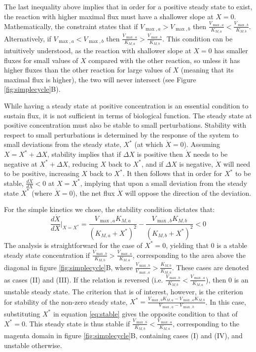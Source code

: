     The last inequality above implies that in order for a positive steady state to exist, the reaction with higher maximal flux must have a shallower slope at $X=0$.
    Mathematically, the constraint states that if $V_{\max,a}>V_{\max,b}$ then $\frac{V_{\max,a}}{K_{M,a}}<\frac{V_{\max,b}}{K_{M,b}}$.
    Alternatively, if $V_{\max,a}<V_{\max,b}$ then $\frac{V_{\max,a}}{K_{M,a}}>\frac{V_{\max,b}}{K_{M,b}}$.
    This condition can be intuitively understood, as the reaction with shallower slope at $X=0$ has smaller fluxes for small values of $X$ compared with the other reaction, so unless it has higher fluxes than the other reaction for large values of $X$ (meaning that its maximal flux is higher), the two will never intersect (see Figure \ref{fig:simplecycle}B).

    While having a steady state at positive concentration is an essential condition to sustain flux, it is not sufficient in terms of biological function.
    The steady state at positive concentration must also be stable to small perturbations.
    Stability with respect to small perturbations is determined by the response of the system to small deviations from the steady state, $X^*$ (at which $\dot X=0$).
    Assuming $X = X^*+\Delta X$, stability implies that if $\Delta X$ is positive then $\dot X$ needs to be negative at $X^*+\Delta X$, reducing $X$ back to $X^*$, and if $\Delta X$ is negative, $\dot X$ will need to be positive, increasing $X$ back to $X^*$.
    It then follows that in order for $X^*$ to be stable, $\frac{d\dot X}{dX} <0$ at $X=X^*$, implying that upon a small deviation from the steady state $X^*$ (where $\dot X=0$), the net flux $\dot X$ will oppose the direction of the deviation.

    For the simple kinetics we chose, the stability condition dictates that:
    \begin{equation}
        \label{eq:stable}
      \frac{d\dot X}{dX}\Big\vert_{X=X^*} = \frac{V_{\max,a}K_{M,a}}{(K_{M,a}+X^*)^2}-\frac{V_{\max,b}K_{M,b}}{(K_{M,b}+X^*)^2}<0
    \end{equation}
    The analysis is straightforward for the case of $X^*=0$, yielding that $0$ is a stable steady state concentration if $\frac{V_{\max,b}}{K_{M,b}}>\frac{V_{\max,a}}{K_{M,a}}$, corresponding to the area above the diagonal in figure \ref{fig:simplecycle}B, where $\frac{V_{\max,b}}{V_{\max,a}}>\frac{K_{M,b}}{K_{M,a}}$. These cases are denoted as cases (II) and (III).
    If the relation is reversed (i.e. $\frac{V_{\max,b}}{K_{M,b}}<\frac{V_{\max,a}}{K_{M,a}}$), then $0$ is an unstable steady state.
    The criterion that is of interest, however, is the criterion for stability of the non-zero steady state, $X^*=\frac{V_{\max,b}K_{M,a}-V_{\max,a}K_{M,b}}{V_{\max,a}-V_{\max,b}}$.
    In this case, substituting $X^*$ in equation \ref{eq:stable} gives the opposite condition to that of $X^*=0$.
    This steady state is thus stable if $\frac{V_{\max,b}}{K_{M,b}}<\frac{V_{\max,a}}{K_{M,a}}$, corresponding to the magenta domain in figure \ref{fig:simplecycle}B, containing cases (I) and (IV), and unstable otherwise.

